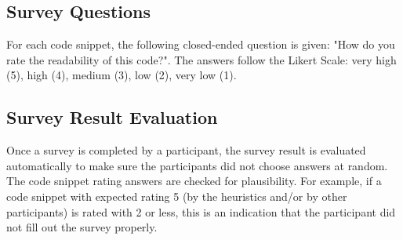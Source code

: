 \documentclass[%
class=scrreprt,
chapterprefix=false,%
open=right,%
twoside=false,%
paper=a4,%
logofile={Logo\_zentral\_farbig\_EN.png},%
thesistype=masterproposal,%
UKenglish,%
]{se2thesis}
\begin{document}
	
	
	
	
	


\subsection{Survey Questions} %
For each code snippet, the following closed-ended question is given: "How do you rate the readability of this code?". The answers follow the Likert Scale: very high (5), high (4), medium (3), low (2), very low (1).

\subsection{Survey Result Evaluation}
Once a survey is completed by a participant, the survey result is evaluated automatically to make sure the participants did not choose answers at random. The code snippet rating answers are checked for plausibility. For example, if a code snippet with expected rating 5 (by the heuristics and/or by other participants) is rated with 2 or less, this is an indication that the participant did not fill out the survey properly.
\end{document}

